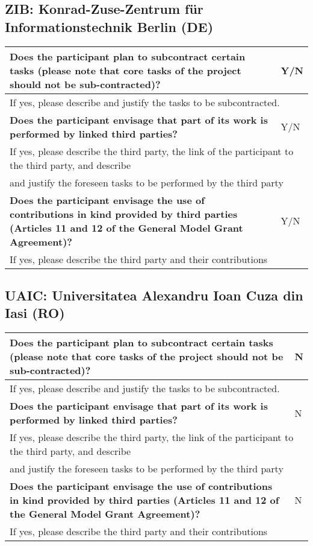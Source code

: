 \subsection{ZIB: Konrad-Zuse-Zentrum für Informationstechnik Berlin (DE)}

\begin{longtable}{|p{}|p{}|}
\hline
{\bf Does the participant plan to subcontract certain tasks (please
  note that core tasks of the project should not be sub-contracted)?}
&
Y/N
\\
\hline
\multicolumn{2}{|l|}{
If yes, please describe and justify the tasks to be subcontracted.}
\\
\hline
{\bf Does the participant envisage that  part of its work is performed
  by linked third parties?}
&
Y/N
\\
\hline
\multicolumn{2}{|l|}{If yes, please describe the third party, the link of the
  participant to the third party, and describe}\\
\multicolumn{2}{|l|}{and justify the foreseen
tasks to be performed by the third party}
\\
\hline
{\bf Does the participant envisage the use of contributions in kind
provided by third parties (Articles 11 and 12 of the General Model
Grant Agreement)?}
&
Y/N
\\
\hline
\multicolumn{2}{|l|}{If yes, please describe the third party and their contributions}
\\
\hline
\end{longtable}


\subsection{UAIC: Universitatea Alexandru Ioan Cuza din Iasi (RO)}

\begin{longtable}{|p{}|p{}|}
\hline
{\bf Does the participant plan to subcontract certain tasks (please
  note that core tasks of the project should not be sub-contracted)?}
&
N
\\
\hline
\multicolumn{2}{|l|}{
If yes, please describe and justify the tasks to be subcontracted.}
\\
\hline
{\bf Does the participant envisage that  part of its work is performed
  by linked third parties?}
&
N
\\
\hline
\multicolumn{2}{|l|}{If yes, please describe the third party, the link of the
  participant to the third party, and describe}\\
\multicolumn{2}{|l|}{and justify the foreseen
tasks to be performed by the third party}
\\
\hline
{\bf Does the participant envisage the use of contributions in kind
provided by third parties (Articles 11 and 12 of the General Model
Grant Agreement)?}
&
N
\\
\hline
\multicolumn{2}{|l|}{If yes, please describe the third party and their contributions}
\\
\hline
\end{longtable}


